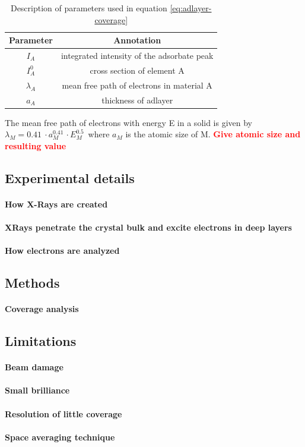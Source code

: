 \begin{table}[h!]\centering
\caption{Description of parameters used in equation
\ref{eq:adlayer-coverage}}
\label{tab:adlayer-coverage-parameters}
 \begin{tabular}{cc}
  Parameter & Annotation \\ \hline
  $I_A$	& integrated intensity of the adsorbate peak \\
  $I_A^0$ & cross section of element A \\
  $\lambda_A$ & mean free path of electrons in material A \\
  $a_A$ & thickness of adlayer \\
 \end{tabular}
\end{table}

The mean free path of electrons with energy E in a solid is given by $\lambda_M=\SI{0,41}{}\cdot a_M^{\SI{0,41}{}}\cdot E_M^{\SI{0,5}{}} $ where $a_M$ is the atomic size of M. 
\textcolor{red}{\textbf{Give atomic size and resulting value}}

\subsection{Experimental details}
	\paragraph{How X-Rays are created}
	\paragraph{XRays penetrate the crystal bulk and excite electrons in deep layers}
	\paragraph{How electrons are analyzed}
\subsection{Methods}
	\paragraph{Coverage analysis}
\subsection{Limitations}
	\paragraph{Beam damage}
	\paragraph{Small brilliance}
	\paragraph{Resolution of little coverage}
	\paragraph{Space averaging technique}